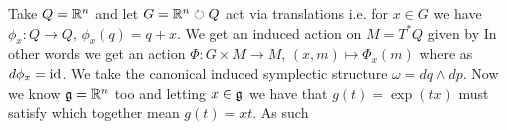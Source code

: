 \documentclass{article}
\begin{document}
\begin{example}
Take $Q = \mathbb{R}^n$ and let $G = \mathbb{R}^n \circlearrowright Q$ act via translations i.e. for $x \in G$ we have $\phi_x:Q \to Q, \, \phi_x(q) = q+x$. We get an induced action on $M = T^\ast Q$ given by 
In other words we get an action $\Phi : G \times M \to M, \, (x,m) \mapsto \Phi_x(m)$ where 
as $d\phi_x = \operatorname{id}$. We take the canonical induced symplectic structure $\omega = dq \wedge dp$. Now we know $\mathfrak{g} = \mathbb{R}^n$ too and letting $x \in \mathfrak{g}$ we have that $g(t) = \exp(tx)$ must satisfy 
which together mean $g(t) = xt$. As such 
\end{example}
\end{document}

